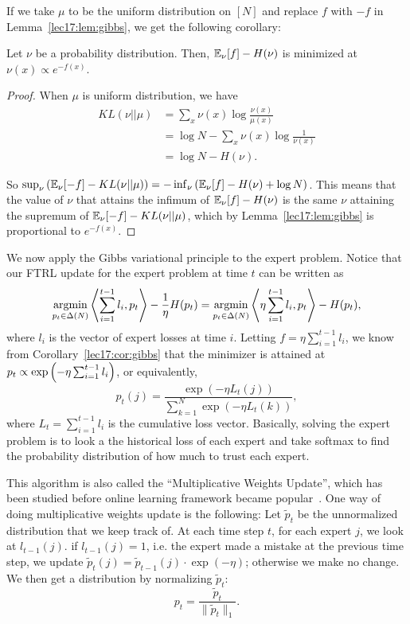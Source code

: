 If we take $\mu$ to be the uniform distribution on $[N]$ and replace $f$ with $-f$ in Lemma~\ref{lec17:lem:gibbs}, we get the following corollary:

\begin{corollary}\label{lec17:cor:gibbs}
	Let $\nu$ be a probability distribution. Then, 
	$\mathbb{E}_\nu[f] - H(\nu)$ is minimized at $\nu(x) \propto e^{-f(x)}$.
\end{corollary} 

\begin{proof}
When $\mu$ is uniform distribution, we have
\begin{align}
KL(\nu||\mu) &= \sum_x \nu(x) \log \frac{\nu(x)}{\mu(x)} \\
&= \log N - \sum_x \nu(x) \log \frac{1}{\nu(x)} \\
&= \log N - H(\nu).
\end{align}

So $\sup_\nu \left(\mathbb{E}_\nu[-f] - KL(\nu||\mu)\right) = -\inf_\nu \left(\mathbb{E}_\nu[f] - H(\nu) + \log N\right)$. This means that the value of $\nu$ that attains the infimum of $\mathbb{E}_\nu[f] - H(\nu)$ is the same $\nu$ attaining the supremum of $\mathbb{E}_\nu[-f] - KL(\nu||\mu)$, which by Lemma~\ref{lec17:lem:gibbs} is proportional to $e^{-f(x)}$.
\end{proof}

We now apply the Gibbs variational principle to the expert problem. Notice that our FTRL update for the expert problem at time $t$ can be written as
\begin{equation}
\operatorname*{\textup{argmin}}_{p_t \in \Delta(N)} \left\langle \sum_{i=1}^{t-1}l_i, p_t \right\rangle - \frac{1}{\eta}H(p_t) = \operatorname*{\textup{argmin}}_{p_t \in \Delta(N)} \left\langle\eta \sum_{i=1}^{t-1}l_i, p_t \right\rangle - H(p_t),
\end{equation}
where $l_i$ is the vector of expert losses at time $i$. Letting $f = \eta \sum_{i=1}^{t-1} l_i$, we know from Corollary~\ref{lec17:cor:gibbs} that the minimizer is attained at $p_t \propto \exp \left(-\eta \sum_{i=1}^{t-1}l_i \right)$, or equivalently,  
\begin{equation}
p_t(j) = \frac{\exp(-\eta L_t(j))}{\sum_{k=1}^N \exp(-\eta L_t(k))},
\end{equation}
where $L_t = \sum_{i=1}^{t-1}l_i$ is the cumulative loss vector. Basically, solving the expert problem is to look a the historical loss of each expert and take softmax to find the probability distribution of how much to trust each expert. 

This algorithm is also called the ``Multiplicative Weights Update'', which has been studied before online learning framework became popular~\cite{arora2005fast, freund1997decision, littlestone1994weighted}. One way of doing multiplicative weights update is the following: Let $\tilde{p}_t$ be the unnormalized distribution that we keep track of. At each time step $t$, for each expert $j$, we look at $l_{t-1}(j)$. if $l_{t-1}(j)=1$, i.e. the expert made a mistake at the previous time step, we update $\tilde{p}_t(j) = \tilde{p}_{t-1}(j) \cdot \exp(-\eta)$; otherwise we make no change. We then get a distribution by normalizing $\tilde{p}_t$:
\begin{equation}
p_t = \frac{\tilde{p}_t}{\|\tilde{p}_t\|_1}.
\end{equation}

